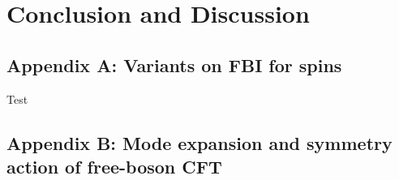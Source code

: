 
\section{Conclusion and Discussion}

\subsection{Appendix A: Variants on FBI for spins}
\label{Appendix:Variants}
Test
\subsection{Appendix B: Mode expansion and symmetry action of free-boson CFT}
\label{Appendix:CFT}